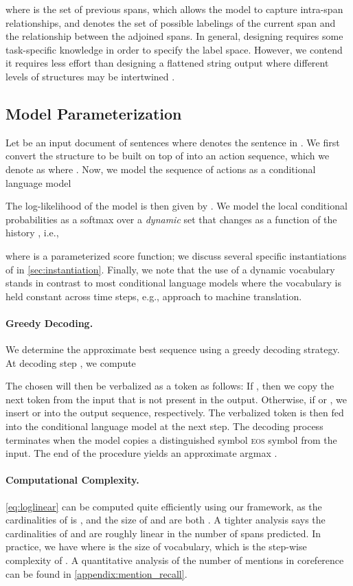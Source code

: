 \documentclass[11pt]{article}
\begin{document}
where  is the set of previous spans, which allows the model to capture intra-span relationships, and  denotes the set of possible labelings of the current span and the relationship between the adjoined spans. 
In general, designing  requires some task-specific knowledge in order to specify the label space.
However, we contend it requires less effort than designing a flattened string output where different levels of structures may be intertwined \cite{tanl}. 


\subsection{Model Parameterization}
Let  be an input document of  sentences where  denotes the  sentence in .
We first convert the structure to be built on top of  into an action sequence, which we denote as  where . 
Now, we model the sequence of actions  as a conditional language model

The log-likelihood of the model is then given by .
We model the local conditional probabilities  as a softmax over
a \emph{dynamic} set  that changes as a function of the history , i.e.,

where  is a parameterized score function; we discuss several specific instantiations of  in \cref{sec:instantiation}.
Finally, we note that the use of a dynamic vocabulary stands in contrast to most conditional language models where the vocabulary is held constant across time steps, e.g.,  approach to machine translation.

\paragraph{Greedy Decoding.}
We determine the approximate best sequence  using a greedy decoding strategy.
At decoding step , we compute

The chosen  will then be verbalized as a token as follows: If , then we copy the next token from the input that is not present in the output. 
Otherwise, if  or , we insert  or  into the output sequence, respectively. 
The verbalized token is then fed into the conditional language model at the next step. 
The decoding process terminates when the model copies a distinguished symbol \textsc{eos} symbol from the input.
The end of the procedure yields an approximate argmax .


\paragraph{Computational Complexity.}
\cref{eq:loglinear} can be computed quite efficiently using our framework, as the cardinalities of  is , and the size of  and  are both .
A tighter analysis says the cardinalities of  and  are roughly linear in the number of spans predicted. 
In practice, we have  where  is the size of vocabulary, which is the step-wise complexity of \cite{tanl}.
A quantitative analysis of the number of mentions in coreference can be found in \cref{appendix:mention_recall}. 
\end{document}
